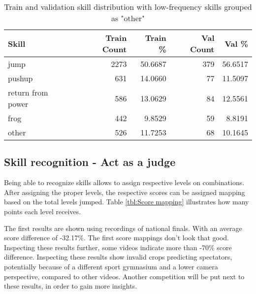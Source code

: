 \begin{table}[h!]
    \centering
    \begin{tabular}{|l|r|r|r|r|}
        \hline
        \textbf{Skill} & \textbf{Train Count} & \textbf{Train \%} & \textbf{Val Count} & \textbf{Val \%} \\
        \hline
        jump & 2273 & 50.6687 & 379 & 56.6517 \\
        pushup & 631 & 14.0660 & 77 & 11.5097 \\
        return from power & 586 & 13.0629 & 84 & 12.5561 \\
        frog & 442 & 9.8529 & 59 & 8.8191 \\
        other & 526 & 11.7253 & 68 & 10.1645 \\
        \hline
    \end{tabular}
    \caption[Skill distribution skills limited classes]{Train and validation skill distribution with low-frequency skills grouped as "other"}
    \label{tab:skill_distribution_grouped_final}
\end{table}



\subsection{Skill recognition - Act as a judge}
\label{results:skill-recognition-act-as-a-judge}

Being able to recognize skills allows to assign respective levels on combinations. After assigning the proper levels, the respective scores can be assigned mapping based on the total levels jumped. Table \ref{tbl:Score mapping} illustrates how many points each level receives.

The first results are shown using recordings of national finals. With an average score difference of -32.17\%. The first score mappings don't look that good.
Inspecting these results further, some videos indicate more than -70\% score difference. Inspecting these results show invalid crops predicting spectators, potentially because of a different sport gymnasium and a lower camera perspective, compared to other videos.
Another competition will be put next to these results, in order to gain more insights.

